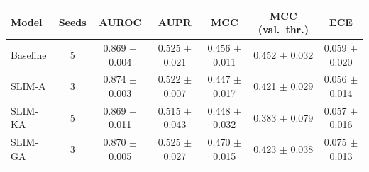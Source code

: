 \begin{tabular}{lcccccc}
\toprule
Model & Seeds & AUROC & AUPR & MCC & MCC (val.\ thr.) & ECE \\
\midrule
Baseline & 5 & 0.869 $\pm$ 0.004 & 0.525 $\pm$ 0.021 & 0.456 $\pm$ 0.011 & 0.452 $\pm$ 0.032 & 0.059 $\pm$ 0.020 \\
SLIM-A & 3 & 0.874 $\pm$ 0.003 & 0.522 $\pm$ 0.007 & 0.447 $\pm$ 0.017 & 0.421 $\pm$ 0.029 & 0.056 $\pm$ 0.014 \\
SLIM-KA & 5 & 0.869 $\pm$ 0.011 & 0.515 $\pm$ 0.043 & 0.448 $\pm$ 0.032 & 0.383 $\pm$ 0.079 & 0.057 $\pm$ 0.016 \\
SLIM-GA & 3 & 0.870 $\pm$ 0.005 & 0.525 $\pm$ 0.027 & 0.470 $\pm$ 0.015 & 0.423 $\pm$ 0.038 & 0.075 $\pm$ 0.013 \\
\bottomrule
\end{tabular}
